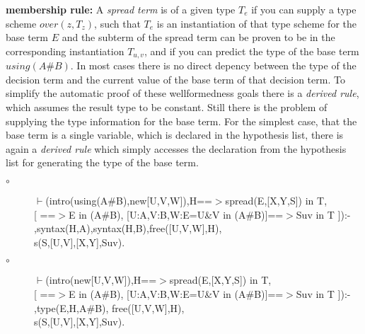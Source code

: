 \documentclass[11pt]{report}
\begin{document}
\begin{enumerate}
 {\bf membership rule:}
 A \emph{spread term} is of a given type $T_e$ if you can
 supply a type scheme $over(z,T_z)$, such that $T_e$ is an
 instantiation of that type scheme for the base term $E$ and 
 the subterm of the spread term can be proven to be in the 
 corresponding instantiation $T_{u,v}$, and if you can predict the
 type of the base term $using(A\#B)$. 
 In most cases there is no direct
 depency between the type of the decision term and the current
 value of the base term of that decision term. To simplify
 the automatic proof of these wellformedness goals there is
 a \emph{derived rule}, which assumes the result type to be constant.
 Still there is the problem of
 supplying the type information for the base term. For the
 simplest case, that the base term is a single variable, which
 is declared in the hypothesis list, there is again a \emph{derived 
 rule} which simply accesses the declaration from the hypothesis
 list for generating the type of the base term.
 \begin{description}
 \item[$\circ$]
\begin{sf}\begin{tabbing}
$\vdash$(intro(using(A\#B),new[U,V,W]),H==$>$spread(E,[X,Y,S]) in T,\\[-0.15ex]
\hspace{2em}[ ==$>$E in (A\#B), [U:A,V:B,W:E=U\&V in (A\#B)]==$>$Suv in T ]):-\\[-0.15ex]
\hspace{2em}{\bf derived},syntax(H,A),syntax(H,B),free([U,V,W],H),\\[-0.15ex]
\hspace{2em}s(S,[U,V],[X,Y],Suv).
\end{tabbing}\end{sf}

 \item[$\circ$]
\begin{sf}\begin{tabbing}
$\vdash$(intro(new[U,V,W]),H==$>$spread(E,[X,Y,S]) in T,\\[-0.15ex]
\hspace{2em}[ ==$>$E in (A\#B), [U:A,V:B,W:E=U\&V in (A\#B)]==$>$Suv in T ]):-\\[-0.15ex]
\hspace{2em}{\bf derived},type(E,H,A\#B), free([U,V,W],H),\\[-0.15ex]
\hspace{2em}s(S,[U,V],[X,Y],Suv).
\end{tabbing}\end{sf}

 \end{description}
  
 \end{enumerate}
  
\end{document}
